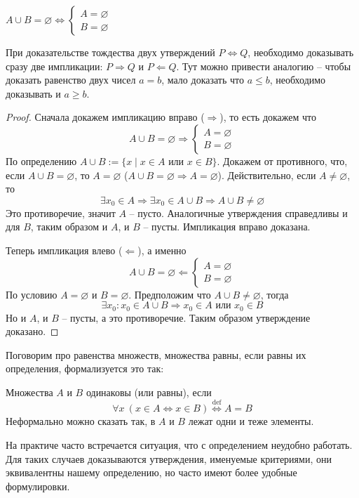 \begin{statement}
$A\cup B=\varnothing \iff
\begin{cases}
A=\varnothing\\ 
B=\varnothing
\end{cases}$
\end{statement}
При доказательстве тождества двух утверждений $P\iff Q$, необходимо доказывать сразу две импликации: $P\Rightarrow Q$ и $P\Leftarrow Q$. Тут можно привести аналогию -- чтобы доказать равенство двух чисел $a=b$, мало доказать что $a\leq b$, необходимо доказывать и $a\geq b$.
\begin{proof}
Сначала докажем импликацию вправо ($\Rightarrow$), то есть докажем что
\[A\cup B=\varnothing \Rightarrow
\begin{cases}
A=\varnothing\\ 
B=\varnothing
\end{cases}\]
По определению $A\cup B := \{x\mid x\in A \text{ или } x\in B\}$. Докажем от противного, что, если $A\cup B=\varnothing$, то $A=\varnothing$ ($A\cup B=\varnothing\Rightarrow A=\varnothing$). Действительно, если $A\neq\varnothing$, то
\[\exists x_0\in A \Rightarrow \exists x_0\in A\cup B\Rightarrow A\cup B\neq\varnothing\]
Это противоречие, значит $A$ -- пусто. Аналогичные утверждения справедливы и для $B$, таким образом и $A$, и $B$ -- пусты. Импликация вправо доказана.

Теперь импликация влево ($\Leftarrow$), а именно
\[A\cup B=\varnothing \Leftarrow
\begin{cases}
A=\varnothing\\ 
B=\varnothing
\end{cases}\]
По условию $A=\varnothing$ и $B=\varnothing$. Предположим что $A\cup B\neq\varnothing$, тогда
\[\exists x_0\colon x_0\in A\cup B\Rightarrow x_0\in A\text{ или } x_0\in B\]
Но и $A$, и $B$ -- пусты, а это противоречие. Таким образом утверждение доказано.
\end{proof}
Поговорим про равенства множеств, множества равны, если равны их определения, формализуется это так:
\begin{definition}\label{def:seteq}
Множества $A$ и $B$ одинаковы (или равны), если
\[\forall x\ (x\in A\iff x\in B) \overset{\mathrm{def}}{\iff} A=B\]
Неформально можно сказать так, в $A$ и $B$ лежат одни и теже элементы.
\end{definition}
На практиче часто встречается ситуация, что с определением неудобно работать. Для таких случаев доказываются утверждения, именуемые критериями, они эквивалентны нашему определению, но часто имеют более удобные формулировки.
